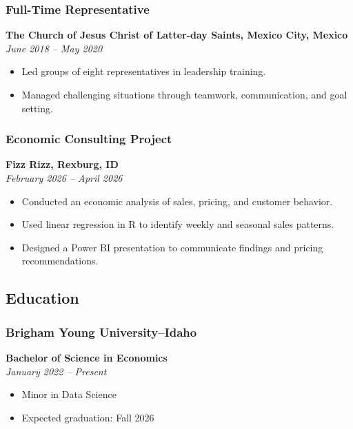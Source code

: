 \documentclass[
  letterpaper,
  DIV=11,
  numbers=noendperiod]{scrartcl}
\providecommand{\tightlist}{%
  \setlength{\itemsep}{0pt}\setlength{\parskip}{0pt}}
\begin{document}
\subsubsection{Full-Time Representative}\label{full-time-representative}

\textbf{The Church of Jesus Christ of Latter-day Saints, Mexico City,
Mexico}\\
\emph{June 2018 -- May 2020}

\begin{itemize}
\tightlist
\item
  Led groups of eight representatives in leadership training.
\item
  Managed challenging situations through teamwork, communication, and
  goal setting.
\end{itemize}

\subsubsection{Economic Consulting
Project}\label{economic-consulting-project}

\textbf{Fizz Rizz, Rexburg, ID}\\
\emph{February 2026 -- April 2026}

\begin{itemize}
\tightlist
\item
  Conducted an economic analysis of sales, pricing, and customer
  behavior.
\item
  Used linear regression in R to identify weekly and seasonal sales
  patterns.
\item
  Designed a Power BI presentation to communicate findings and pricing
  recommendations.
\end{itemize}

\subsection{Education}\label{education}

\subsubsection{Brigham Young
University--Idaho}\label{brigham-young-universityidaho}

\textbf{Bachelor of Science in Economics}\\
\emph{January 2022 -- Present}

\begin{itemize}
\tightlist
\item
  Minor in Data Science
\item
  Expected graduation: Fall 2026
\end{itemize}
\end{document}
